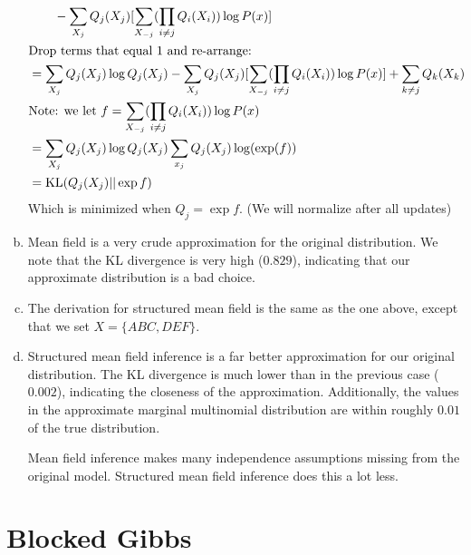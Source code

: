 \documentclass[12pt, letterpaper]{article}
\begin{document}
\begin{enumerate}[a.]
\begin{align*}
            &\qquad {} - \sum_{X_j} Q_j(X_j)[\sum_{X_{-j}} (\Qdef[i \neq j]) \log P(x)]\\
        &\text{Drop terms that equal 1 and re-arrange:}\\
        &= \sum_{X_j} Q_j(X_j) \log Q_j(X_j) 
          - \sum_{X_j}Q_j(X_j)[\sum_{X_{-j}}(\Qdef[i \neq j]) \log P(x)]
          + \sum_{k \neq j} Q_k(X_k)\\
        &\text{Note: we let } f = \sum_{X_{-j}}(\Qdef[i \neq j]) \log P(x)\\
        &= \sum_{X_j} Q_j(X_j) \log Q_j(X_j) \sum_{x_j} Q_j(X_j) \log (\exp(f))\\
        &= \text{KL}(Q_j(X_j)||\exp f)
    \end{align*}
    Which is minimized when $Q_j = \exp f$. (We will normalize after all updates)

\item Mean field is a very crude approximation for the original distribution. We note that the KL divergence is very high ($0.829$), indicating that our approximate distribution is a bad choice.
\item The derivation for structured mean field is the same as the one above, except that we set $X = \{ABC, DEF\}$.
\item Structured mean field inference is a far better approximation for our original distribution. The KL divergence is much lower than in the previous case ($0.002$), indicating the closeness of the approximation. Additionally, the values in the approximate marginal multinomial distribution are within roughly $0.01$ of the true distribution.

Mean field inference makes many independence assumptions missing from the original model. Structured mean field inference does this a lot less.
\end{enumerate}

\setcounter{section}{4}
\section{Blocked Gibbs}
\end{document}
